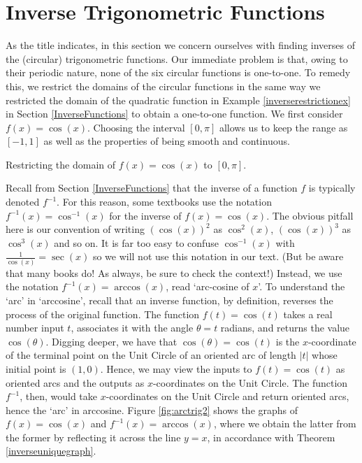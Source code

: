 \section{Inverse Trigonometric Functions}

\label{ArcTrig}

As the title indicates, in this section we concern ourselves with finding inverses of the (circular) trigonometric functions.  Our immediate problem is that, owing to their periodic nature, none of the six circular functions is  one-to-one. To remedy this, we restrict the domains of the circular functions in the same way we restricted the domain of the quadratic function in Example \ref{inverserestrictionex} in Section \ref{InverseFunctions} to obtain a one-to-one function.  We first consider $f(x) = \cos(x)$. Choosing the interval $[0,\pi]$ allows us to keep the range as $[-1,1]$ as well as the properties of being smooth and continuous.

\medskip

\noindent\begin{minipage}{\textwidth}
\begin{center}
\end{center} 
\captionsetup{type=figure}
\caption{Restricting the domain of $f(x) = \cos(x)$ to $[0,\pi]$.}
\label{fig:arctrig1}
\end{minipage}

\medskip

Recall from Section \ref{InverseFunctions} that the inverse of a function $f$ is typically denoted $f^{-1}$.  For this reason, some textbooks use the notation $f^{-1}(x) = \cos^{-1}(x)$ for the inverse of $f(x) = \cos(x)$.  The obvious pitfall here is our convention of writing $(\cos(x))^2$ as $\cos^{2}(x)$, $(\cos(x))^3$ as $\cos^{3}(x)$ and so on.  It is far too easy to confuse $\cos^{-1}(x)$ with  $\frac{1}{\cos(x)} = \sec(x)$ so we will not use this notation in our text. (But be aware that many books do! As always, be sure to check the context!) Instead, we use the notation $f^{-1}(x) = \arccos(x)$, read `arc-cosine of $x$'.  To understand the `arc' in `arccosine', recall that an inverse function, by definition, reverses the process of the original function. The function $f(t) = \cos(t)$ takes a real number input $t$, associates it with the angle $\theta = t$ radians, and returns the value $\cos(\theta)$.  Digging deeper,  we have that $\cos(\theta) = \cos(t)$ is the $x$-coordinate of the terminal point on the Unit Circle of an oriented arc of length $|t|$ whose initial point is $(1, 0)$.  Hence, we may view the inputs to $f(t) = \cos(t)$ as oriented arcs and the outputs as $x$-coordinates on the Unit Circle.  The function $f^{-1}$, then, would take $x$-coordinates on the Unit Circle and return oriented arcs, hence the `arc' in arccosine. Figure \ref{fig:arctrig2} shows the graphs of $f(x) = \cos(x)$ and $f^{-1}(x) = \arccos(x)$, where we obtain the latter from the former by reflecting it across the line $y=x$, in accordance with Theorem \ref{inverseuniquegraph}. 

